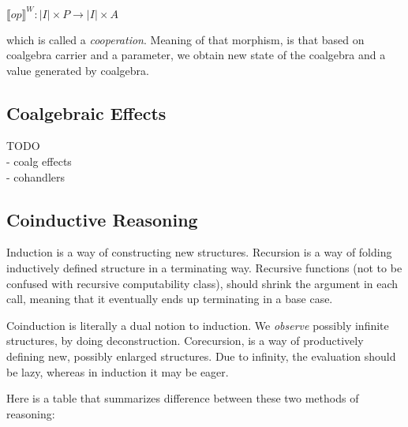 \documentclass[declaration,shortabstract]{iithesis}
\theoremstyle{definition} \newtheorem{definition}{Definition}[chapter]
\theoremstyle{remark} \newtheorem{remark}[definition]{Observation}
\theoremstyle{plain} \newtheorem{theorem}[definition]{Theorem}
\theoremstyle{plain} \newtheorem{lemma}[definition]{Lemma}
\begin{document}
    \begin{center}
        $ {\llbracket op \rrbracket}^W : {|I|} \times {P} \rightarrow  {|I|} \times {A} $
    \end{center}

    \noindent
    which is called a \textit{cooperation}. Meaning of that morphism, is that
    based on coalgebra carrier and a parameter, we obtain new state of the
    coalgebra and a value generated by coalgebra.

    \subsection{Coalgebraic Effects}

\noindent
TODO \\
- coalg effects \\
- cohandlers

    \subsection{Coinductive Reasoning}

    Induction is a way of constructing new structures. Recursion is a way of
    folding inductively defined structure in a terminating way. Recursive
    functions (not to be confused with recursive computability class), should
    shrink the argument in each call, meaning that it eventually ends up
    terminating in a base case.

    Coinduction is literally a dual notion to induction. We \textit{observe} possibly
    infinite structures, by doing deconstruction. Corecursion, is a way
    of productively defining new, possibly enlarged structures. Due to infinity,
    the evaluation should be lazy, whereas in induction it may be eager.

    Here is a table that summarizes difference between these two methods of reasoning:
\end{document}
